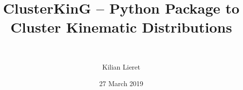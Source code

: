 %
\title{ClusterKinG -- Python Package to Cluster Kinematic Distributions}
\subtitle{\ \relax}
\author{Kilian Lieret}
\newcommand*{\coauthors}{}
\date{27 March 2019}
%
%